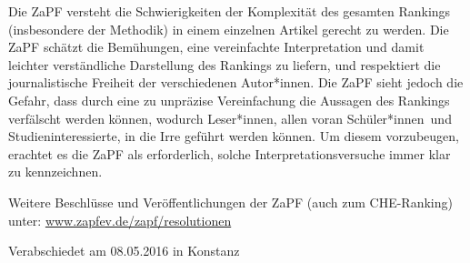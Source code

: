 \documentclass[DIV=calc]{scrartcl}
\newcommand{\gen}{*innen}
\begin{document}
    Die ZaPF versteht die Schwierigkeiten der Komplexität des gesamten Rankings
    (insbesondere der Methodik) in einem einzelnen Artikel gerecht zu werden. Die
    ZaPF schätzt die Bemühungen, eine vereinfachte Interpretation und damit leichter
    verständliche Darstellung des Rankings zu liefern, und respektiert die journalistische
    Freiheit der verschiedenen Autor\gen. Die ZaPF sieht jedoch die Gefahr, dass
    durch eine zu unpräzise Vereinfachung die Aussagen des Rankings verfälscht werden
    können, wodurch Leser\gen, allen voran Schüler\gen\ und Studieninteressierte,
    in die Irre geführt werden können. Um diesem vorzubeugen, erachtet es die ZaPF
    als erforderlich, solche Interpretationsversuche immer klar zu kennzeichnen.
    
    Weitere Beschl\"usse und Ver\"offentlichungen der ZaPF (auch zum CHE-Ranking) unter:
    \href{http://www.zapfev.de/zapf/resolutionen/}{www.zapfev.de/zapf/resolutionen}
    
    \vfill
    \begin{flushright}
        Verabschiedet am 08.05.2016 in Konstanz
    \end{flushright}
    
    
    
    
\end{document}
